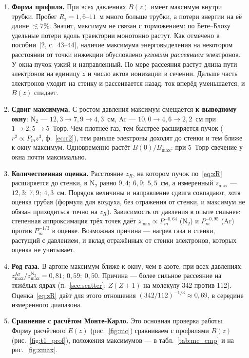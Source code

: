 \documentclass[12pt,a4paper]{article}
\newcommand{\Nt}{\mathrm{N_2}}
\begin{document}
\begin{enumerate}
  \item \textbf{Форма профиля.} При всех давлениях $B(z)$ имеет максимум
        внутри трубки. Пробег $R_\text{э} = 1{,}6$--$11$~м много больше
        трубки, а потери энергии на её длине $\lesssim 7\%$. Значит,
        максимум не связан с торможением: по Бете--Блоху удельные потери
        вдоль траектории монотонно растут. Как отмечено в
        пособии~[2, с.~43--44], наличие максимума энерговыделения на
        некотором расстоянии от точки инжекции обусловлено
        \emph{угловым рассеянием} электронов. У окна пучок узкий и
        направленный. По мере рассеяния растут длина пути электронов на
        единицу $z$ и число актов ионизации в сечении. Дальше часть
        электронов уходит на стенку и рассеивается назад, ток вперёд
        уменьшается, и $B(z)$ спадает.
  \item \textbf{Сдвиг максимума.} С ростом давления максимум смещается
        \textbf{к выводному окну}: $\Nt$ --- $12{,}3 \to 7{,}9 \to 4{,}3$~см,
        Ar --- $10{,}0 \to 4{,}6 \to 2{,}2$~см при $1 \to 2{,}5 \to 5$~Торр.
        Чем плотнее газ, тем быстрее расширяется пучок
        ($r^2 \propto P_m z^3$, ф.~\eqref{eq:r2}), тем раньше электроны
        доходят до стенки и тем ближе к окну максимум. Одновременно растёт
        $B(0)/B_\text{max}$: при 5~Торр свечение у окна почти максимально.
  \item \textbf{Количественная оценка.} Расстояние $z_R$, на котором
        пучок по~\eqref{eq:zR} расширяется до стенки, в $\Nt$ равно
        $9{,}4;\ 6{,}9;\ 5{,}5$~см, а измеренный $z_\text{max}$ ---
        $12{,}3;\ 7{,}9;\ 4{,}3$~см. Порядок величины и направление сдвига
        совпадают, хотя оценка грубая (формула для воздуха, без
        отражения от стенки, и максимум не обязан приходиться точно на
        $z_R$). Зависимость от давления в опыте сильнее: степенная
        аппроксимация трёх точек даёт $z_\text{max}\propto P_m^{-0{,}64}$
        ($\Nt$) и $P_m^{-0{,}95}$ (Ar) против $P_m^{-1/3}$ в оценке.
        Возможная причина --- нагрев газа и стенки, растущий с
        давлением, и вклад отражённых от стенки электронов, которых
        оценка не учитывает.
  \item \textbf{Род газа.} В аргоне максимум ближе к окну, чем в азоте,
        при всех давлениях: $z_\text{max}^\text{Ar}/z_\text{max}^{\Nt}
        = 0{,}81;\ 0{,}59;\ 0{,}50$. Причина --- более сильное рассеяние на
        тяжёлых ядрах (п.~\ref{sec:scatter}: $Z(Z+1)$ на молекулу 342
        против 112). Оценка~\eqref{eq:zR} даёт для этого отношения
        $(342/112)^{-1/3} \approx 0{,}69$, в середине измеренного
        диапазона.
  \item \textbf{Сравнение с расчётом Монте-Карло.} Это основная проверка
        работы. Форму расчётного $E(z)$ (рис.~\ref{fig:mc}) сравниваем
        с профилями $B(z)$ (рис.~\ref{fig:t1_prof}), положения
        максимумов --- в табл.~\ref{tab:mc_cmp} и на рис.~\ref{fig:zmax}.


\end{enumerate}
\end{document}
